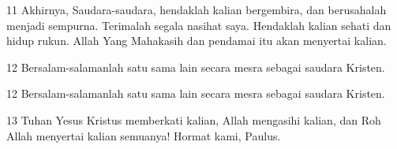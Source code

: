 \par 11 Akhirnya, Saudara-saudara, hendaklah kalian bergembira, dan berusahalah menjadi sempurna. Terimalah segala nasihat saya. Hendaklah kalian sehati dan hidup rukun. Allah Yang Mahakasih dan pendamai itu akan menyertai kalian.
\par 12 Bersalam-salamanlah satu sama lain secara mesra sebagai saudara Kristen.
\par 12 Bersalam-salamanlah satu sama lain secara mesra sebagai saudara Kristen.
\par 13 Tuhan Yesus Kristus memberkati kalian, Allah mengasihi kalian, dan Roh Allah menyertai kalian semuanya! Hormat kami, Paulus.


